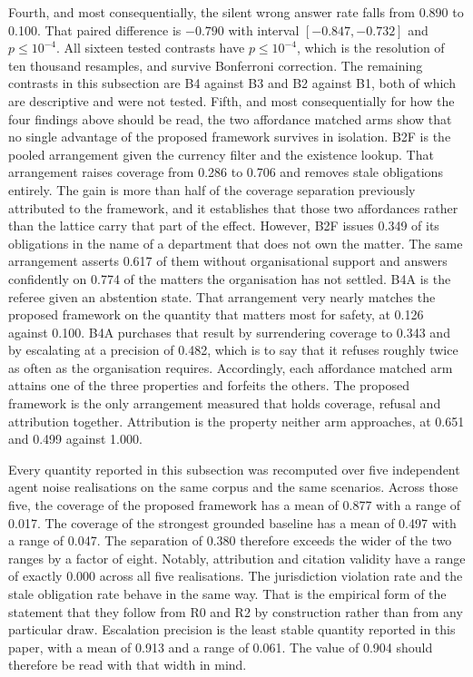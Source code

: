 \documentclass[journal]{IEEEtran}
\begin{document}
Fourth, and most consequentially, the silent wrong answer rate falls from 0.890 to 0.100. That paired difference is $-0.790$ with interval $[-0.847,-0.732]$ and $p\le10^{-4}$. All sixteen tested contrasts have $p\le10^{-4}$, which is the resolution of ten thousand resamples, and survive Bonferroni correction. The remaining contrasts in this subsection are B4 against B3 and B2 against B1, both of which are descriptive and were not tested. Fifth, and most consequentially for how the four findings above should be read, the two affordance matched arms show that no single advantage of the proposed framework survives in isolation. B2F is the pooled arrangement given the currency filter and the existence lookup. That arrangement raises coverage from 0.286 to 0.706 and removes stale obligations entirely. The gain is more than half of the coverage separation previously attributed to the framework, and it establishes that those two affordances rather than the lattice carry that part of the effect. However, B2F issues 0.349 of its obligations in the name of a department that does not own the matter. The same arrangement asserts 0.617 of them without organisational support and answers confidently on 0.774 of the matters the organisation has not settled. B4A is the referee given an abstention state. That arrangement very nearly matches the proposed framework on the quantity that matters most for safety, at 0.126 against 0.100. B4A purchases that result by surrendering coverage to 0.343 and by escalating at a precision of 0.482, which is to say that it refuses roughly twice as often as the organisation requires. Accordingly, each affordance matched arm attains one of the three properties and forfeits the others. The proposed framework is the only arrangement measured that holds coverage, refusal and attribution together. Attribution is the property neither arm approaches, at 0.651 and 0.499 against 1.000.

Every quantity reported in this subsection was recomputed over five independent agent noise realisations on the same corpus and the same scenarios. Across those five, the coverage of the proposed framework has a mean of 0.877 with a range of 0.017. The coverage of the strongest grounded baseline has a mean of 0.497 with a range of 0.047. The separation of 0.380 therefore exceeds the wider of the two ranges by a factor of eight. Notably, attribution and citation validity have a range of exactly 0.000 across all five realisations. The jurisdiction violation rate and the stale obligation rate behave in the same way. That is the empirical form of the statement that they follow from R0 and R2 by construction rather than from any particular draw. Escalation precision is the least stable quantity reported in this paper, with a mean of 0.913 and a range of 0.061. The value of 0.904 should therefore be read with that width in mind.
\end{document}
